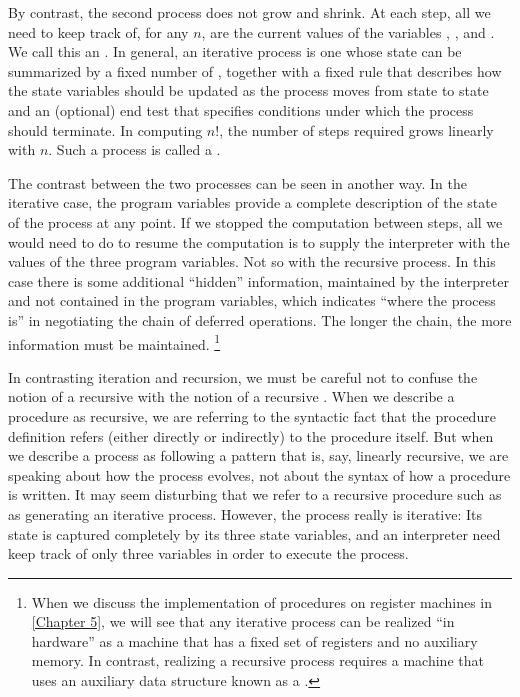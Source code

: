 By contrast, the second process does not grow and shrink.
At each step, all we need to keep track of, for any \( n \), are the current values of the variables , , and .
We call this an .
In general, an iterative process is one whose state can be summarized by a fixed number of , together with a fixed rule that describes how the state variables should be updated as the process moves from state to state and an (optional) end test that specifies conditions under which the process should terminate.
In computing \( n! \), the number of steps required grows linearly with \( n \).
Such a process is called a .

The contrast between the two processes can be seen in another way.
In the iterative case, the program variables provide a complete description of the state of the process at any point.
If we stopped the computation between steps, all we would need to do to resume the computation is to supply the interpreter with the values of the three program variables.
Not so with the recursive process.
In this case there is some additional “hidden” information, maintained by the interpreter and not contained in the program variables, which indicates “where the process is” in negotiating the chain of deferred operations.
The longer the chain, the more information must be maintained.%
\footnote{
	When we discuss the implementation of procedures on register machines in \cref{Chapter 5}, we will see that any iterative process can be realized “in hardware” as a machine that has a fixed set of registers and no auxiliary memory.
	In contrast, realizing a recursive process requires a machine that uses an auxiliary data structure known as a .
}

In contrasting iteration and recursion, we must be careful not to confuse the notion of a recursive  with the notion of a recursive .
When we describe a procedure as recursive, we are referring to the syntactic fact that the procedure definition refers (either directly or indirectly) to the procedure itself.
But when we describe a process as following a pattern that is, say, linearly recursive, we are speaking about how the process evolves, not about the syntax of how a procedure is written.
It may seem disturbing that we refer to a recursive procedure such as  as generating an iterative process.
However, the process really is iterative:
Its state is captured completely by its three state variables, and an interpreter need keep track of only three variables in order to execute the process.

